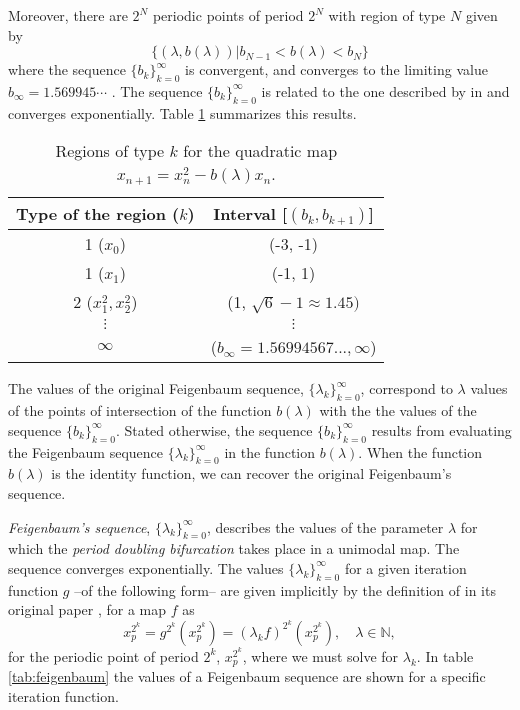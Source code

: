 \documentclass[10pt,twoside,titlepage]{book}
\numberwithin{equation}{chapter}
\numberwithin{figure}{chapter}
\numberwithin{table}{chapter}
\theoremstyle{plain}%
\theoremstyle{definition}
\theoremstyle{remark}
\begin{document}
Moreover, there are $2^{N}$ periodic points of period $2^{N}$ with region of type $N$ given by \[\{(\lambda,b(\lambda))\vert b_{N-1}<b(\lambda)<b_{N}\}\]
where the sequence $\{b_{k}\}_{k=0}^{\infty}$ is convergent, and converges to the limiting value $b_{\infty}=1.569945\cdots$ \cite{Solis2004}. The sequence $\{b_{k}\}_{k=0}^{\infty}$ is related to the one described by \cite{Feigenbaum} in \cite{Feigenbaum} and converges exponentially. Table \ref{tab:RegionsTypeK} summarizes this results.

\begin{table}
	\begin{tabular}{|c|c|}
		\hline
		Type of the region ($k$)  & Interval {[}$(b_{k},b_{k+1})${]} \tabularnewline
		\hline
		1 ($x_{0}$)  & (-3, -1) \tabularnewline
		\hline
		1 ($x_{1}$)  & (-1, 1) \tabularnewline
		\hline
		2 ($x_{1}^{2},x_{2}^{2}$)  & (1, $\sqrt{6}-1\approx1.45)$ \tabularnewline
		\hline
		$\vdots$  & $\vdots$ \tabularnewline
		\hline
		$\infty$  & ($b_{\infty}=1.56994567...,\infty$) \tabularnewline
		\hline
	\end{tabular}
	\caption{Regions of type $k$ for the quadratic map $x_{n+1}=x_{n}^{2}-b(\lambda)x_{n}$.}
	\label{tab:RegionsTypeK}
\end{table}

The values of the original Feigenbaum sequence, $\{\lambda_{k}\}_{k=0}^{\infty}$, correspond to $\lambda$ values of the points of intersection of the function $b(\lambda)$ with the the values of the sequence $\{b_{k}\}_{k=0}^{\infty}$. Stated otherwise, the  sequence $\{b_{k}\}_{k=0}^{\infty}$ results from evaluating the Feigenbaum sequence $\{\lambda_{k}\}_{k=0}^{\infty}$ in the function $b(\lambda)$. When the function $b(\lambda)$ is the identity function, we can recover the original Feigenbaum's sequence.

\emph{Feigenbaum's sequence}, $\{\lambda_{k}\}_{k=0}^{\infty}$, describes the values of the parameter $\lambda$ for which the \emph{period doubling bifurcation} takes place in a unimodal map. The sequence converges exponentially. The values $\{\lambda_{k}\}_{k=0}^{\infty}$ for a given iteration function $g$ --of the following form-- are given implicitly by the definition of  \cite{Feigenbaum} in its original paper \cite{Feigenbaum}, for a map $f$ as
\[x_{p}^{2^{k}}=g^{2^{k}}(x_{p}^{2^{k}})=(\lambda_{k}f)^{2^{k}}(x_{p}^{2^{k}}),\quad\lambda\in\mathbb{N},\]
for the periodic point of period $2^{k}$, $x_{p}^{2^{k}}$, where we must solve for $\lambda_{k}$. In table \ref{tab:feigenbaum} the values of a Feigenbaum sequence are shown for a specific iteration function.
\end{document}
